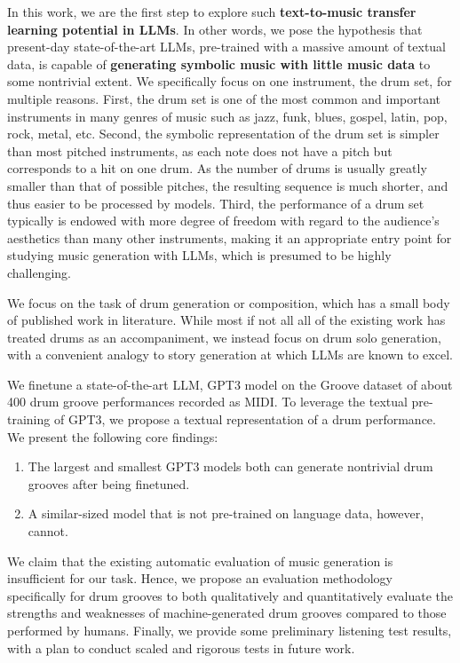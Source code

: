 \documentclass[letterpaper]{article} %
\begin{document}
In this work, we are the first step to explore such \textbf{text-to-music transfer learning potential in LLMs}. In other words, we pose the hypothesis that present-day state-of-the-art LLMs, pre-trained with a massive amount of textual data, is capable of \textbf{generating symbolic music with little music data} to some nontrivial extent. We specifically focus on one instrument, the drum set, for multiple reasons. First, the drum set is one of the most common and important instruments in many genres of music such as jazz, funk, blues, gospel, latin, pop, rock, metal, etc. Second, the symbolic representation of the drum set is simpler than most pitched instruments, as each note does not have a pitch but corresponds to a hit on one drum. As the number of drums is usually greatly smaller than that of possible pitches, the resulting sequence is much shorter, and thus easier to be processed by models. Third, the performance of a drum set typically is endowed with more degree of freedom with regard to the audience's aesthetics than many other instruments, making it an appropriate entry point for studying music generation with LLMs, which is presumed to be highly challenging.

We focus on the task of drum generation or composition, which has a small body of published work in literature. While most if not all all of the existing work has treated drums as an accompaniment, we instead focus on drum solo generation, with a convenient analogy to story generation at which LLMs are known to excel.

We finetune a state-of-the-art LLM, GPT3 model \cite{NEURIPS2020_1457c0d6} on the Groove dataset \cite{gillick2019learning} of about 400 drum groove performances recorded as MIDI. To leverage the textual pre-training of GPT3, we propose a textual representation of a drum performance. We present the following core findings:
\begin{enumerate}
    \item The largest and smallest GPT3 models both can generate nontrivial drum grooves after being finetuned.
    \item A similar-sized model that is not pre-trained on language data, however, cannot.
\end{enumerate}
We claim that the existing automatic evaluation of music generation is insufficient for our task. Hence, we propose an evaluation methodology specifically for drum grooves to both qualitatively and quantitatively evaluate the strengths and weaknesses of machine-generated drum grooves compared to those performed by humans. Finally, we provide some preliminary listening test results, with a plan to conduct scaled and rigorous tests in future work.
\end{document}
